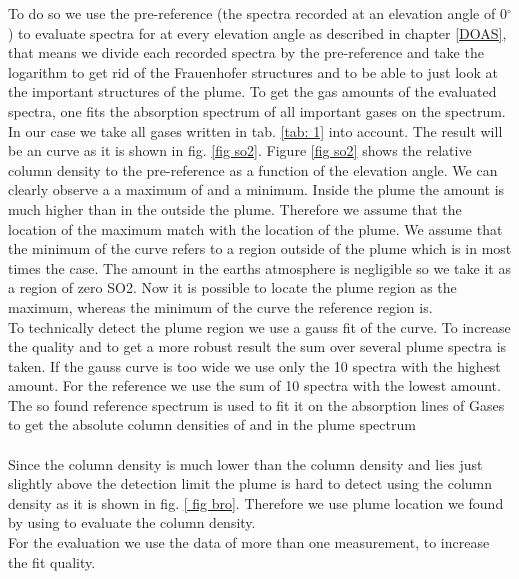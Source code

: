 \documentclass  [
  paper    = a4,
  BCOR     = 10mm,
  twoside,
  fontsize = 12pt,
  fleqn,
  toc      = bibnumbered,
  toc      = listofnumbered,
  numbers  = noendperiod,
  headings = normal,
  listof   = leveldown,
  version  = 3.03
]                                       {scrreprt}
\begin{document}
	To do so we use the pre-reference (the spectra recorded at an elevation angle of  0$^{\circ} $) to evaluate spectra for  at every elevation angle as described in chapter \ref{DOAS}, that means we divide each recorded spectra by the pre-reference and take the logarithm  to get rid of the Frauenhofer structures and to be able to just look at the important structures of the plume. To get the gas amounts of the evaluated spectra, one fits the absorption spectrum of all important gases on the spectrum. In our case we take all gases written in tab. \ref{tab: 1} into account. The result will be an  curve as it is shown in fig. \ref{fig so2}.
	Figure \ref{fig so2} shows the relative  column density to the pre-reference as a function of the elevation angle. We can clearly observe a a maximum of  and a minimum. Inside the plume the  amount is much higher than in the outside the plume. Therefore we assume that the location of the  maximum match with the location of the plume. We assume that the minimum of the  curve refers to a region outside of the plume which is in most times the case. The  amount in the earths atmosphere is negligible so we take it as a region of zero SO2. Now it is possible to locate the plume region as the  maximum, whereas the minimum of the  curve the reference region is. \\
	To technically detect the plume region we use a gauss fit of the  curve.
	To increase the quality and to get a more robust result the sum over several plume spectra is taken. If the gauss curve is too wide we use only the 10 spectra with the highest  amount. For the reference we use the sum of 10 spectra with the lowest  amount.\\
	The so found reference spectrum is used to fit it on the  absorption lines of Gases to get the absolute column densities of  and  in the plume spectrum\\
	\\
	Since the  column density is much lower than the  column density and lies just slightly above the detection limit the plume is hard to detect using the  column density as it is shown in fig. \ref{ fig bro}. 
	Therefore we use plume location we found by using  to evaluate the  column density.\\
	For the evaluation we use the data of more than one measurement, to increase the fit quality.\\
\end{document}
